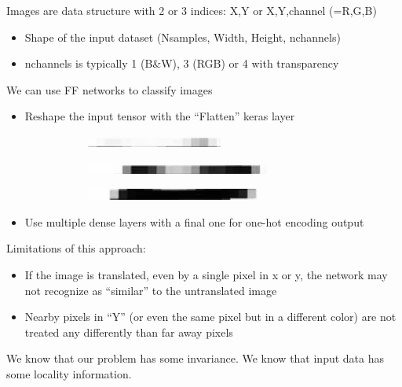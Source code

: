 Images are data structure with 2 or 3 indices: X,Y or X,Y,channel (=R,G,B)
\begin{itemize}
	\item Shape of the input dataset (Nsamples, Width, Height, nchannels)
	\item nchannels is typically 1 (B\&W), 3 (RGB) or 4 with transparency
\end{itemize}
We can use FF networks to classify images
\begin{itemize}
	\item Reshape the input tensor with the “Flatten” keras layer
	\begin{figure}[ht]
		\centering
		\begin{subfigure}{.3\textwidth}
			\centering
			\includegraphics[width=0.9\linewidth]{figure_ml/classif1.png}
		\end{subfigure}%
		\begin{subfigure}{.3\textwidth}
			\centering
			\includegraphics[width=0.9\linewidth]{figure_ml/classif2.png}
		\end{subfigure}%
		\begin{subfigure}{.3\textwidth}
			\centering
			\includegraphics[width=0.9\linewidth]{figure_ml/classif3.png}
		\end{subfigure}
	\end{figure}
	
	
	\item Use multiple dense layers with a final one for one-hot encoding output
\end{itemize}
Limitations of this approach:
\begin{itemize}
	\item If the image is translated, even by a single pixel in x or y, the network may not recognize as “similar” to the untranslated image
	\item Nearby pixels in “Y” (or even the same pixel but in a different color) are not treated any differently than far away pixels
\end{itemize}
We know that our problem has some invariance. We know that input data has some locality information.

